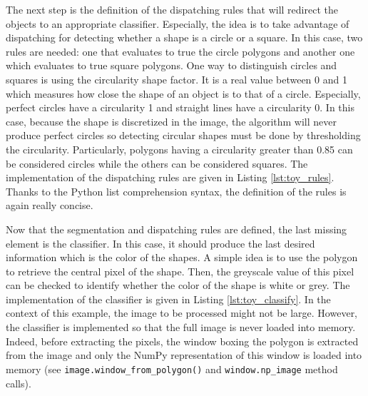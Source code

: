 The next step is the definition of the dispatching rules that will redirect the objects to an appropriate classifier. Especially, the idea is to take advantage of dispatching for detecting whether a shape is a circle or a square. In this case, two rules are needed: one that evaluates to true the circle polygons and another one which evaluates to true square polygons. One way to distinguish circles and squares is using the circularity shape factor. It is a real value between 0 and 1 which measures how close the shape of an object is to that of a circle. Especially, perfect circles have a circularity 1 and straight lines have a circularity 0. In this case, because the shape is discretized in the image, the algorithm will never produce perfect circles so detecting circular shapes must be done by thresholding the circularity. Particularly, polygons having a circularity greater than 0.85 can be considered circles while the others can be considered squares. The implementation of the dispatching rules are given in Listing \ref{lst:toy_rules}. Thanks to the Python list comprehension syntax, the definition of the rules is again really concise. 

Now that the segmentation and dispatching rules are defined, the last missing element is the classifier. In this case, it should produce the last desired information which is the color of the shapes. A simple idea is to use the polygon to retrieve the central pixel of the shape. Then, the greyscale value of this pixel can be checked to identify whether the color of the shape is white or grey. The implementation of the classifier is given in Listing \ref{lst:toy_classify}. In the context of this example, the image to be processed might not be large. However, the classifier is implemented so that the full image is never loaded into memory. Indeed, before extracting the pixels, the window boxing the polygon is extracted from the image and only the NumPy representation of this window is loaded into memory (see \texttt{image.window\_from\_polygon()} and \texttt{window.np\_image} method calls). 

